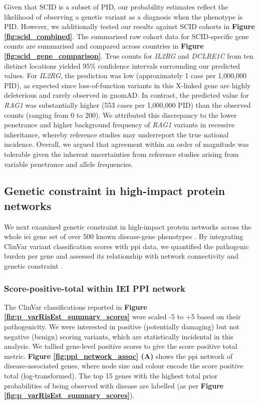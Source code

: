 Given that SCID is a subset of PID, our probability estimates reflect the likelihood of observing a genetic variant as a diagnosis when the phenotype is PID. However, we additionally tested our results against SCID cohorts in 
 \textbf{Figure \ref{fig:scid_combined}}.
 The summarised raw cohort data for SCID-specific gene counts are summarised and compared across countries in \textbf{Figure \ref{fig:scid_gene_comparison}}.
True counts for \textit{IL2RG} and \textit{DCLRE1C} from ten distinct locations yielded 95\% confidence intervals surrounding our predicted values. For \textit{IL2RG}, the prediction was low (approximately 1 case per 1,000,000 PID), as expected since loss-of-function variants in this X-linked gene are highly deleterious and rarely observed in gnomAD. In contrast, the predicted value for \textit{RAG1} was substantially higher (553 cases per 1,000,000 PID) than the observed counts (ranging from 0 to 200). We attributed this discrepancy to the lower penetrance and higher background frequency of \textit{RAG1} variants in recessive inheritance, whereby reference studies may underreport the true national incidence. Overall, we argued that agreement within an order of magnitude was tolerable given the inherent uncertainties from reference studies arising from variable penetrance and allele frequencies.

\FloatBarrier
\subsection{Genetic constraint in high-impact protein networks}

We next examined genetic constraint in high-impact protein networks across the whole \ac{iei} gene set of over 500 known disease-gene phenotypes \cite{tangye_human_2022}. By integrating ClinVar variant classification scores with \ac{ppi} data, we quantified the pathogenic burden per gene and assessed its relationship with network connectivity and genetic constraint
\cite{szklarczyk2025string, karczewski2020mutational}.

\subsubsection{Score-positive-total within IEI PPI network}

The ClinVar classifications reported in 
\textbf{Figure \ref{fig:p_varRisEst_summary_scores}} were scaled -5 to +5 based on their pathogenicity. 
We were interested in positive (potentially damaging) but not negative (benign) scoring variants, which are statistically incidental in this analysis. 
We tallied gene-level positive scores to give the score positive total metric. 
\textbf{Figure \ref{fig:ppi_network_assoc} (A)} shows the \ac{ppi} network of disease-associated genes, where node size and colour encode the score positive total (log-transformed). 
The top 15 genes with the highest total prior probabilities of being observed with disease are labelled (as per \textbf{Figure \ref{fig:p_varRisEst_summary_scores}}).


